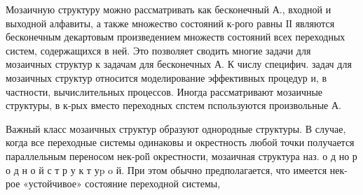 \documentclass[10pt]{article}
\begin{document}
Мозаичную структуру можно рассматривать как бесконечный А., входной и выходной алфавиты, а также множество состояний к-рого равны ІІ являются бесконечным декартовым произведением множеств состояний всех переходных систем, содержащихся в ней. Это позволяет сводить многие задачи для мозаичных структур к задачам для бесконечных А. К числу специфич. задач для мозаичных структур относится моделирование эффективных процедур и, в частности, вычислительных процессов. Иногда рассматривают мозаичные структуры, в к-рых вместо переходных спстем пспользуются произвольные А.



Важный класс мозаичных структур образуют однородные структуры. В случае, когда все переходные системы одинаковы и окрестность любой точки получается параллельным переносом нек-роі̆і окрестности, мозаичная структура наз. о д но р о д н о й с т р у к т уp o й. При этом обычно предполагается, что имеется нек-рое «устойчивое» состояние переходной системы,
\end{document}
